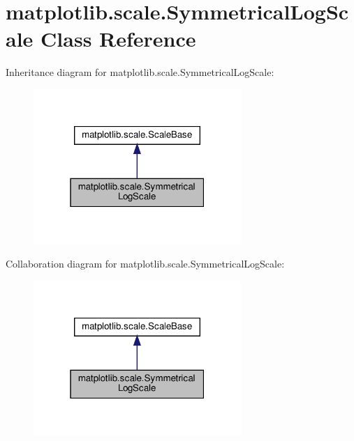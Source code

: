 \hypertarget{classmatplotlib_1_1scale_1_1SymmetricalLogScale}{}\section{matplotlib.\+scale.\+Symmetrical\+Log\+Scale Class Reference}
\label{classmatplotlib_1_1scale_1_1SymmetricalLogScale}


Inheritance diagram for matplotlib.\+scale.\+Symmetrical\+Log\+Scale\+:
\nopagebreak
\begin{figure}[H]
\begin{center}
\leavevmode
\includegraphics[width=223pt]{classmatplotlib_1_1scale_1_1SymmetricalLogScale__inherit__graph}
\end{center}
\end{figure}


Collaboration diagram for matplotlib.\+scale.\+Symmetrical\+Log\+Scale\+:
\nopagebreak
\begin{figure}[H]
\begin{center}
\leavevmode
\includegraphics[width=223pt]{classmatplotlib_1_1scale_1_1SymmetricalLogScale__coll__graph}
\end{center}
\end{figure}
